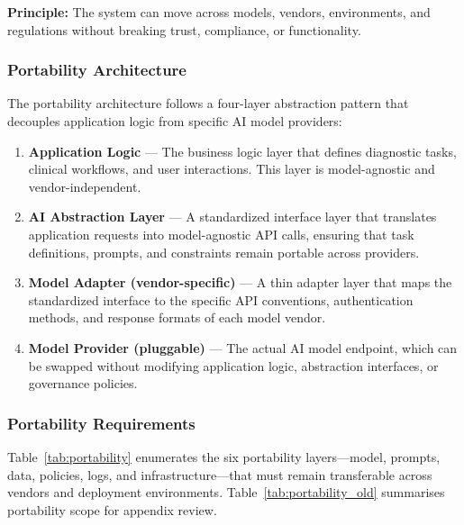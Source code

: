 \textbf{Principle:} The system can move across models, vendors, environments, and regulations without breaking trust, compliance, or functionality.

\subsubsection{Portability Architecture}

The portability architecture follows a four-layer abstraction pattern that decouples application logic from specific AI model providers:

\begin{enumerate}
    \item \textbf{Application Logic} --- The business logic layer that defines diagnostic tasks, clinical workflows, and user interactions. This layer is model-agnostic and vendor-independent.
    \item \textbf{AI Abstraction Layer} --- A standardized interface layer that translates application requests into model-agnostic API calls, ensuring that task definitions, prompts, and constraints remain portable across providers.
    \item \textbf{Model Adapter (vendor-specific)} --- A thin adapter layer that maps the standardized interface to the specific API conventions, authentication methods, and response formats of each model vendor.
    \item \textbf{Model Provider (pluggable)} --- The actual AI model endpoint, which can be swapped without modifying application logic, abstraction interfaces, or governance policies.
\end{enumerate}

\subsubsection{Portability Requirements}

Table~\ref{tab:portability} enumerates the six portability layers---model, prompts, data, policies, logs, and infrastructure---that must remain transferable across vendors and deployment environments.
\noindent Table~\ref{tab:portability_old} summarises portability scope for appendix review.

